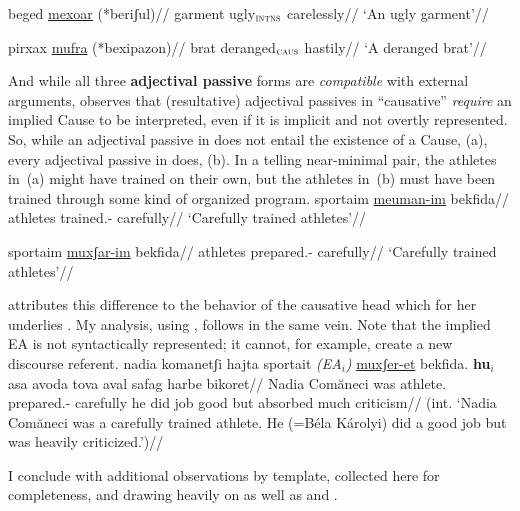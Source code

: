 	\a \begingl
		\gla beged \underline{mexoar} (*beriʃul)//
		\glb garment ugly$_{\text{\gsc{INTNS}}}$ \phantom{(*}carelessly//
		\glft `An ugly garment'//
	\endgl

	\a \begingl
		\gla pirxax \underline{mufra} (*bexipazon)//
		\glb brat deranged$_{\text{\gsc{CAUS}}}$ \phantom{(*}hastily//
		\glft `A deranged brat'//
	\endgl
\xe

And while all three \textbf{adjectival passive} forms are \emph{compatible} with external arguments, \citet[175]{doron14adj} observes that (resultative) adjectival passives in ``causative'' {\mhuf} \emph{require} an implied Cause to be interpreted, even if it is implicit and not overtly represented. So, while an adjectival passive in {\mpua} does not entail the existence of a Cause, (\nextx a), every adjectival passive in {\mhuf} does, (\nextx b). In a telling near-minimal pair, the athletes in~(\nextx a) might have trained on their own, but the athletes in~(\nextx b) must have been trained through some kind of organized program.
\pex\label{ex:sportaim}
	\a \begingl
		\gla\rightcomment{(\mpua)}sportaim \underline{meuman-im} bekfida//
		\glb athletes trained.- carefully//
		\glft `Carefully trained athletes'//
	\endgl
	
	\a \begingl
		\gla\rightcomment{(\mhuf)}sportaim \underline{muxʃar-im} bekfida//
		\glb athletes prepared.- carefully//
		\glft `Carefully trained athletes'//
	\endgl
\xe

\cite{doron14adj} attributes this difference to the behavior of the causative head  which for her underlies {\thif}. My analysis, using {\vd}, follows in the same vein. Note that the implied EA is not syntactically represented; it cannot, for example, create a new discourse referent.
\ex\label{ex:sportait} \ljudge{*}
	\begingl
		\gla nadia komanetʃi hajta sportait \emph{(EA$_i$)} \underline{muxʃer-et} bekfida. \textbf{hu$_i$} asa avoda tova aval safag harbe bikoret//
		\glb Nadia Com\u{a}neci was athlete. {} prepared.- carefully he did job good but absorbed much criticism//
		\glft (int. `Nadia Com\u{a}neci was a carefully trained athlete. He (=B\'ela K\'arolyi) did a good job but was heavily criticized.')//
	\endgl
\xe

I conclude with additional observations by template, collected here for completeness, and drawing heavily on \cite{doron00} as well as \cite{doron14adj} and \cite{meltzerasscher11}.

